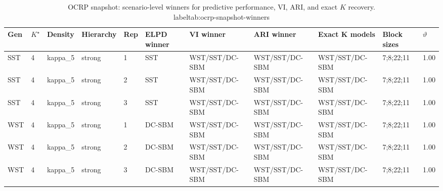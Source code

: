 \begin{table}[!h]
\centering
\caption{OCRP snapshot: scenario-level winners for predictive performance, VI, ARI, and exact $K$ recovery.\\label{tab:ocrp-snapshot-winners}}
\centering
\begin{tabular}[t]{lllllllllll}
\toprule
Gen & $K^\star$ & Density & Hierarchy & Rep & ELPD winner & VI winner & ARI winner & Exact K models & Block sizes & $\vartheta$\\
\midrule
SST & 4 & kappa_5 & strong & 1 & SST & WST/SST/DC-SBM & WST/SST/DC-SBM & WST/SST/DC-SBM & 7;8;22;11 & 1.00\\
SST & 4 & kappa_5 & strong & 2 & SST & WST/SST/DC-SBM & WST/SST/DC-SBM & WST/SST/DC-SBM & 7;8;22;11 & 1.00\\
SST & 4 & kappa_5 & strong & 3 & SST & WST/SST/DC-SBM & WST/SST/DC-SBM & WST/SST/DC-SBM & 7;8;22;11 & 1.00\\
WST & 4 & kappa_5 & strong & 1 & DC-SBM & WST/SST/DC-SBM & WST/SST/DC-SBM & WST/SST/DC-SBM & 7;8;22;11 & 1.00\\
WST & 4 & kappa_5 & strong & 2 & DC-SBM & WST/SST/DC-SBM & WST/SST/DC-SBM & WST/SST/DC-SBM & 7;8;22;11 & 1.00\\
WST & 4 & kappa_5 & strong & 3 & DC-SBM & WST/SST/DC-SBM & WST/SST/DC-SBM & WST/SST/DC-SBM & 7;8;22;11 & 1.00\\
\bottomrule
\end{tabular}
\end{table}
